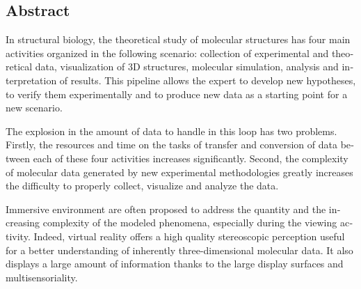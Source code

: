 \begin{otherlanguage}{english}

%
  
\subsection*{Abstract}
  
\footnotesize

In structural biology, the theoretical study of molecular structures has four main activities organized in the following scenario: collection of experimental and theoretical data, visualization of 3D structures, molecular simulation, analysis and interpretation of results. This pipeline allows the expert to develop new hypotheses, to verify them experimentally and to produce new data as a starting point for a new scenario.

The explosion in the amount of data to handle in this loop has two problems. Firstly, the resources and time on the tasks of transfer and conversion of data between each of these four activities increases significantly. Second, the complexity of molecular data generated by new experimental methodologies greatly increases the difficulty to properly collect, visualize and analyze the data.

Immersive environment are often proposed to address the quantity and the increasing complexity of the modeled phenomena, especially during the viewing activity. Indeed, virtual reality offers a high quality stereoscopic perception useful for a better understanding of inherently three-dimensional molecular data. It also displays a large amount of information thanks to the large display surfaces and multisensoriality.


\end{otherlanguage}
